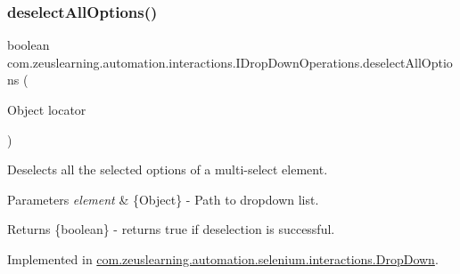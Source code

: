 \hypertarget{interfacecom_1_1zeuslearning_1_1automation_1_1interactions_1_1IDropDownOperations_a4dd56924f06c48807581673c5c757405}{}\label{interfacecom_1_1zeuslearning_1_1automation_1_1interactions_1_1IDropDownOperations_a4dd56924f06c48807581673c5c757405} 
\subsubsection{\texorpdfstring{deselect\+All\+Options()}{deselectAllOptions()}}
{\footnotesize\ttfamily boolean com.\+zeuslearning.\+automation.\+interactions.\+I\+Drop\+Down\+Operations.\+deselect\+All\+Options (\begin{DoxyParamCaption}\item[{Object}]{locator }\end{DoxyParamCaption})}

Deselects all the selected options of a multi-\/select element.


\begin{DoxyParams}{Parameters}
{\em element} & \{Object\} -\/ Path to dropdown list.\\
\hline
\end{DoxyParams}
\begin{DoxyReturn}{Returns}
\{boolean\} -\/ returns {\ttfamily true} if deselection is successful. 
\end{DoxyReturn}


Implemented in \hyperlink{classcom_1_1zeuslearning_1_1automation_1_1selenium_1_1interactions_1_1DropDown_aaf41adc5687eae5fd1980fa34b583a5f}{com.\+zeuslearning.\+automation.\+selenium.\+interactions.\+Drop\+Down}.

\hypertarget{interfacecom_1_1zeuslearning_1_1automation_1_1interactions_1_1IDropDownOperations_ad895dc1fcaa582ece4c02e9102dd73c8}{}\label{interfacecom_1_1zeuslearning_1_1automation_1_1interactions_1_1IDropDownOperations_ad895dc1fcaa582ece4c02e9102dd73c8} 
